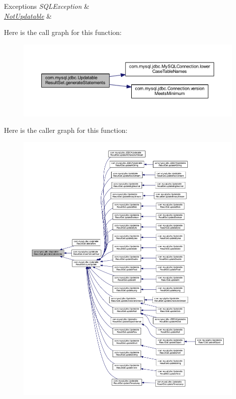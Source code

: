 \begin{DoxyExceptions}{Exceptions}
{\em S\+Q\+L\+Exception} & \\
\hline
{\em \mbox{\hyperlink{classcom_1_1mysql_1_1jdbc_1_1_not_updatable}{Not\+Updatable}}} & \\
\hline
\end{DoxyExceptions}
Here is the call graph for this function\+:
\nopagebreak
\begin{figure}[H]
\begin{center}
\leavevmode
\includegraphics[width=350pt]{classcom_1_1mysql_1_1jdbc_1_1_updatable_result_set_a88b1ef00b296c3cb026dc9c265f137f7_cgraph}
\end{center}
\end{figure}
Here is the caller graph for this function\+:
\nopagebreak
\begin{figure}[H]
\begin{center}
\leavevmode
\includegraphics[width=350pt]{classcom_1_1mysql_1_1jdbc_1_1_updatable_result_set_a88b1ef00b296c3cb026dc9c265f137f7_icgraph}
\end{center}
\end{figure}
